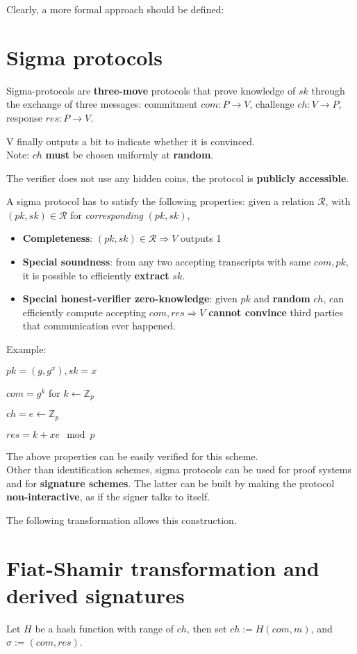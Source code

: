 \documentclass[oneside]{book}
\newcommand{\Z}[0]{\mathbb{Z}}
\begin{document}
Clearly, a more formal approach should be defined:
\section{Sigma protocols}
Sigma-protocols are \textbf{three-move} protocols that prove knowledge of $sk$ through the exchange of three messages: commitment $com: P \rightarrow V$, challenge $ch: V \rightarrow P$, response $res: P \rightarrow V$.

V finally outputs a bit to indicate whether it is convinced.\\

Note: $ch$ \textbf{must} be chosen uniformly at \textbf{random}.

The verifier does not use any hidden coins, the protocol is \textbf{publicly accessible}.

A sigma protocol has to satisfy the following properties: given a relation $\mathcal{R}$, with $(pk, sk) \in \mathcal{R}$ for \textit{corresponding} $(pk, sk)$,
\begin{itemize}
    \item \textbf{Completeness}: $(pk, sk) \in \mathcal{R} \Rightarrow V$ outputs 1
    \item \textbf{Special soundness}: from any two accepting transcripts with same $com, pk$, it is possible to efficiently \textbf{extract} $sk$.
    \item \textbf{Special honest-verifier zero-knowledge}: given $pk$ and \textbf{random} $ch$, can efficiently compute accepting $com, res \Rightarrow V$ \textbf{cannot convince} third parties that communication ever happened. 
\end{itemize}

Example: 

$pk = (g, g^x), sk = x$

$com = g^k$ for $k \leftarrow \Z_p$

$ch = e \leftarrow \Z_p$

$res = k+xe \mod p$

The above properties can be easily verified for this scheme.\\

Other than identification schemes, sigma protocols can be used for proof systems and for \textbf{signature schemes}. The latter can be built by making the protocol \textbf{non-interactive}, as if the signer talks to itself.

The following transformation allows this construction.

\section{Fiat-Shamir transformation and derived signatures}
Let $H$ be a hash function with range of $ch$, then set $ch := H(com, m)$, and $\sigma := (com, res)$.\\
\end{document}
